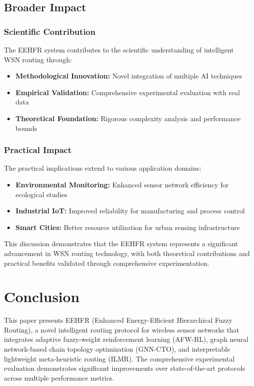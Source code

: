 \documentclass[conference]{IEEEtran}
\begin{document}
\subsection{Broader Impact}

\subsubsection{Scientific Contribution}

The EEHFR system contributes to the scientific understanding of intelligent WSN routing through:

\begin{itemize}
    \item \textbf{Methodological Innovation:} Novel integration of multiple AI techniques
    \item \textbf{Empirical Validation:} Comprehensive experimental evaluation with real data
    \item \textbf{Theoretical Foundation:} Rigorous complexity analysis and performance bounds
\end{itemize}

\subsubsection{Practical Impact}

The practical implications extend to various application domains:

\begin{itemize}
    \item \textbf{Environmental Monitoring:} Enhanced sensor network efficiency for ecological studies
    \item \textbf{Industrial IoT:} Improved reliability for manufacturing and process control
    \item \textbf{Smart Cities:} Better resource utilization for urban sensing infrastructure
\end{itemize}

This discussion demonstrates that the EEHFR system represents a significant advancement in WSN routing technology, with both theoretical contributions and practical benefits validated through comprehensive experimentation.



\section{Conclusion}

This paper presents EEHFR (Enhanced Energy-Efficient Hierarchical Fuzzy Routing), a novel intelligent routing protocol for wireless sensor networks that integrates adaptive fuzzy-weight reinforcement learning (AFW-RL), graph neural network-based chain topology optimization (GNN-CTO), and interpretable lightweight meta-heuristic routing (ILMR). The comprehensive experimental evaluation demonstrates significant improvements over state-of-the-art protocols across multiple performance metrics.
\end{document}
